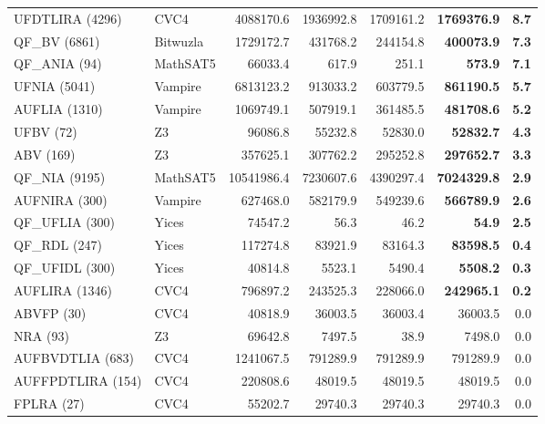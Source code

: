 \begin{tabular}{l@{\hspace{1em}}lrrrrr}
UFDTLIRA (4296)      & CVC4         & 4088170.6   & 1936992.8   & 1709161.2   & \textbf{1769376.9} & \textbf{8.7}\\
QF\_BV (6861)        & Bitwuzla     & 1729172.7   & 431768.2    & 244154.8    & \textbf{400073.9} & \textbf{7.3}\\
QF\_ANIA (94)        & MathSAT5     & 66033.4     & 617.9       & 251.1       & \textbf{573.9} & \textbf{7.1}\\
UFNIA (5041)         & Vampire      & 6813123.2   & 913033.2    & 603779.5    & \textbf{861190.5} & \textbf{5.7}\\
AUFLIA (1310)        & Vampire      & 1069749.1   & 507919.1    & 361485.5    & \textbf{481708.6} & \textbf{5.2}\\
UFBV (72)            & Z3           & 96086.8     & 55232.8     & 52830.0     & \textbf{52832.7} & \textbf{4.3}\\
ABV (169)            & Z3           & 357625.1    & 307762.2    & 295252.8    & \textbf{297652.7} & \textbf{3.3}\\
QF\_NIA (9195)       & MathSAT5     & 10541986.4  & 7230607.6   & 4390297.4   & \textbf{7024329.8} & \textbf{2.9}\\
AUFNIRA (300)        & Vampire      & 627468.0    & 582179.9    & 549239.6    & \textbf{566789.9} & \textbf{2.6}\\
QF\_UFLIA (300)      & Yices        & 74547.2     & 56.3        & 46.2        & \textbf{54.9} & \textbf{2.5}\\
QF\_RDL (247)        & Yices        & 117274.8    & 83921.9     & 83164.3     & \textbf{83598.5} & \textbf{0.4}\\
QF\_UFIDL (300)      & Yices        & 40814.8     & 5523.1      & 5490.4      & \textbf{5508.2} & \textbf{0.3}\\
AUFLIRA (1346)       & CVC4         & 796897.2    & 243525.3    & 228066.0    & \textbf{242965.1} & \textbf{0.2}\\
ABVFP (30)           & CVC4         & 40818.9     & 36003.5     & 36003.4     & 36003.5     & 0.0 \\
NRA (93)             & Z3           & 69642.8     & 7497.5      & 38.9        & 7498.0      & 0.0 \\
AUFBVDTLIA (683)     & CVC4         & 1241067.5   & 791289.9    & 791289.9    & 791289.9    & 0.0 \\
AUFFPDTLIRA (154)    & CVC4         & 220808.6    & 48019.5     & 48019.5     & 48019.5     & 0.0 \\
FPLRA (27)           & CVC4         & 55202.7     & 29740.3     & 29740.3     & 29740.3     & 0.0 \\

\end{tabular}
